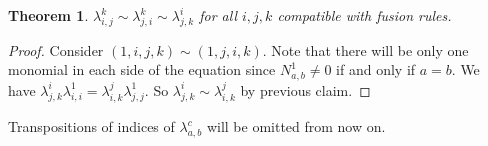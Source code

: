 \documentclass{article}
\newtheorem{lemma}{Lemma}[section]
\newtheorem{theorem}[lemma]{Theorem}
\begin{document}
\begin{theorem}\label{alternation}
$\lambda_{i,j}^k\sim\lambda_{j,i}^k\sim\lambda_{j,k}^i$ for all $i,j,k$ compatible with fusion rules.
\end{theorem}
\begin{proof}
Consider $(1,i,j,k)\sim (1,j,i,k)$.
Note that there will be only one monomial in each side of the equation
since $N_{a,b}^1\neq 0$ if and only if $a=b$.
We have
$\lambda_{j,k}^i\lambda_{i,i}^1=\lambda_{i,k}^j\lambda_{j,j}^1.$
So $\lambda_{j,k}^i\sim \lambda_{i,k}^j$ by previous claim.
\end{proof}

Transpositions of indices of $\lambda_{a,b}^c$ will be omitted from now on.


\end{document}
